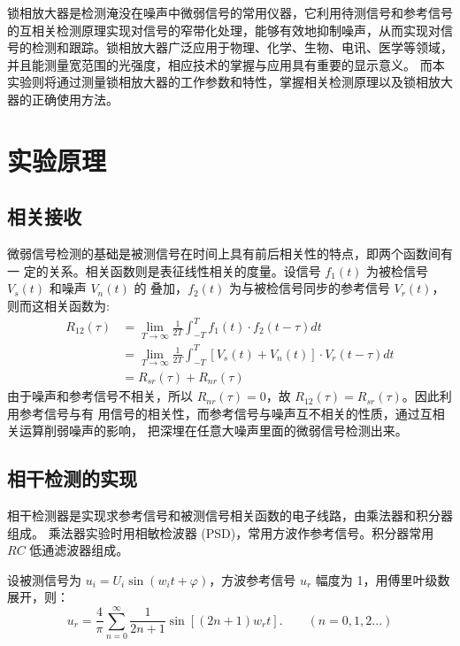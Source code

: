 \documentclass{whureport}
\begin{document}
\begin{multicols}{2}
	锁相放大器是检测淹没在噪声中微弱信号的常用仪器，它利用待测信号和参考信号的互相关检测原理实现对信号的窄带化处理，能够有效地抑制噪声，从而实现对信号的检测和跟踪。锁相放大器广泛应用于物理、化学、生物、电讯、医学等领域，并且能测量宽范围的光强度，相应技术的掌握与应用具有重要的显示意义。 而本实验则将通过测量锁相放大器的工作参数和特性，掌握相关检测原理以及锁相放大器的正确使用方法\cite{book}。

	\section{实验原理}
	\subsection{相关接收}
	微弱信号检测的基础是被测信号在时间上具有前后相关性的特点，即两个函数间有一
定的关系。相关函数则是表征线性相关的度量。设信号 $f_1(t)$ 为被检信号 $V_s(t)$ 和噪声 $V_n(t)$ 的
叠加，$f_2(t)$ 为与被检信号同步的参考信号 $V_r(t)$，则而这相关函数\cite{Lyons2011}为: 
\begin{align*}
    R_{12}(\tau) &= \lim_{T \to \infty} \frac{1}{2T} \int_{-T}^{T} f_1(t) \cdot f_2(t - \tau) dt \\
                  &= \lim_{T \to \infty} \frac{1}{2T} \int_{-T}^{T} [V_s(t) + V_n(t)] \cdot V_r(t - \tau) dt  \tag{1} \\
                  &= R_{sr}(\tau) + R_{nr}(\tau)
\end{align*}
由于噪声和参考信号不相关，所以 $R_{nr}(\tau) = 0$，故 $R_{12}(\tau) = R_{sr}(\tau)$。因此利用参考信号与有
用信号的相关性，而参考信号与噪声互不相关的性质，通过互相关运算削弱噪声的影响，
把深埋在任意大噪声里面的微弱信号检测出来\cite{HorowitzHill2015, Meade1983}。
\subsection{相干检测的实现}
相干检测器是实现求参考信号和被测信号相关函数的电子线路，由乘法器和积分器组成\cite{HorowitzHill2015, Meade1983}。
乘法器实验时用相敏检波器 (PSD)，常用方波作参考信号。积分器常用 $RC$ 低通滤波器组成。

设被测信号为 $u_i = U_i \sin{(w_i t + \varphi)}$，方波参考信号 $u_r$ 幅度为 1，用傅里叶级数展开\cite{HorowitzHill2015}，则：
\begin{equation}
    u_r = \frac{4}{\pi} \sum_{n=0}^{\infty} \frac{1}{2n+1} \sin{[(2n + 1)w_r t]}. \qquad (n = 0, 1, 2 ...)
\end{equation}


\end{multicols}
\end{document}
